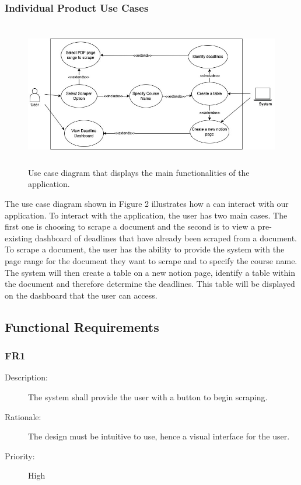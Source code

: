 \documentclass[12pt, titlepage]{article}
\begin{document}
\subsubsection{Individual Product Use Cases}

  \begin{figure}
    \centerline{\includegraphics[width=5in, height=2.5in]{images/flow.jpg}}
    \caption{Use case diagram that displays the main functionalities of the application.}
  \end{figure}
  
  The use case diagram shown in Figure 2 illustrates how a can interact with our application. To interact with the application, the user has two main cases. The first one is choosing to scrape a document and the second is to view a pre-existing dashboard of deadlines that have already been scraped from a document. To scrape a document, the user has the ability to provide the system with the page range for the document they want to scrape and to specify the course name. The system will then create a table on a new notion page, identify a table within the document and therefore determine the deadlines. This table will be displayed on the dashboard that the user can access. 

\subsection{Functional Requirements}

\subsubsection{FR1}

\begin{description}
  \item[Description:] The system shall provide the user with a button to begin scraping. 
  \item[Rationale:] The design must be intuitive to use, hence a visual interface for the user. 
  \item[Priority:] High
\end{description}
\end{document}
